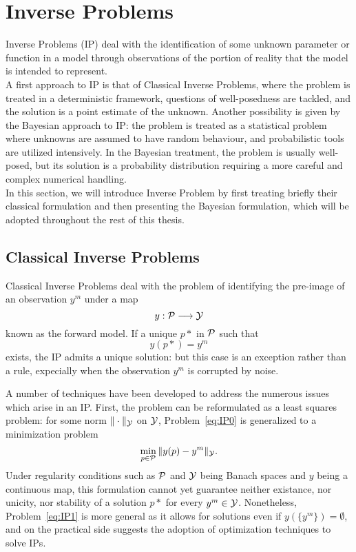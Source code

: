 \section{Inverse Problems} \label{sec:IP}
Inverse Problems (IP) deal with the identification of some unknown parameter or function in a model through observations of the portion of reality that the model is intended to represent. \\
A first approach to IP is that of Classical Inverse Problems, where the problem is treated in a deterministic framework, questions of well-posedness are tackled, and the solution is a point estimate of the unknown.
Another possibility is given by the Bayesian approach to IP: the problem is treated as a statistical problem where unknowns are assumed to have random behaviour, and probabilistic tools are utilized intensively. 
In the Bayesian treatment, the problem is usually well-posed, but its solution is a probability distribution requiring a more careful and complex numerical handling.\\
In this section, we will introduce Inverse Problem by first treating briefly their classical formulation and then presenting the Bayesian formulation, which will be adopted throughout the rest of this thesis.

\subsection{Classical Inverse Problems}\label{sec:CIP}

Classical Inverse Problems deal with the problem of identifying the pre-image of an observation $y^m$ under a map \[y : \mathcal P \longrightarrow \mathcal Y \] known as the forward model. 
If a unique $p*$ in $\mathcal P$ such that
\begin{equation}\label{eq:IP0}
    y(p*) = y^m
\end{equation}
exists, the IP admits a unique solution: but this case is an exception rather than a rule, expecially when the observation $y^m$ is corrupted by noise.

A number of techniques have been developed to address the numerous issues which arise in an IP.
First, the problem can be reformulated as a least squares problem: for some norm $\| \cdot \| _\mathcal Y$ on $\mathcal Y$, Problem~\ref{eq:IP0} is generalized to a minimization problem
\begin{equation}\label{eq:IP1}
    \min_{p\in \mathcal P} \| y(p) - y^m \|_\mathcal Y.
\end{equation}
Under regularity conditions such as $\mathcal P$ and $\mathcal Y$ being Banach spaces and $y$ being a continuous map, this formulation cannot yet guarantee neither existance, nor unicity, nor stability of a solution $p*$ for every $y^m \in \mathcal Y$. Nonetheless, Problem~\ref{eq:IP1} is more general as it allows for solutions even if $y(\{y^m\} )= \emptyset$, and on the practical side suggests the adoption of optimization techniques to solve IPs.

